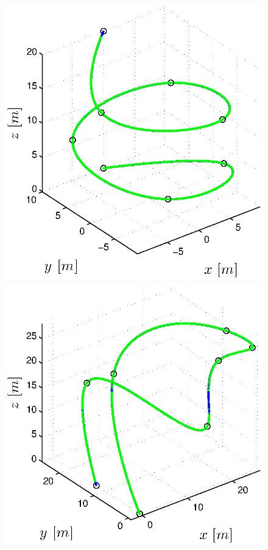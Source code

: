 \begin{figure}[h]
\begin{minipage}[t]{0.32\textwidth}
    \includegraphics[width = \textwidth]{trackings/figure_3D_helix_SplineDegree3_purePursuit_Disturbance_0}
  \end{minipage}
  \hfill
  \begin{minipage}[t]{0.32\textwidth}
    \includegraphics[width = \textwidth]{trackings/figure_3D_agile_SplineDegree3_purePursuit_Disturbance_0}

\end{minipage}
\end{figure}
